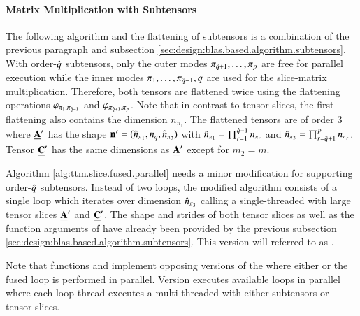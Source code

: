 \paragraph{Matrix Multiplication with Subtensors}
The following algorithm and the flattening of subtensors is a combination of the previous paragraph and subsection \ref{sec:design:blas.based.algorithm.subtensors}.
With order-$\hat{q}$ subtensors, only the outer modes $\pi_{\hat{q}+1},\dots,\pi_{p}$ are free for parallel execution while the inner modes $\pi_{1},\dots,\pi_{\hat{q}-1},q$ are used for the slice-matrix multiplication.
Therefore, both tensors are flattened twice using the flattening operations $\varphi_{\pi_{1},\pi_{\hat{q}-1}}$ and $\varphi_{\pi_{\hat{q}+1},\pi_p}$. 
Note that in contrast to tensor slices, the first flattening also contains the dimension $n_{\pi_{1}}$.
The flattened tensors are of order $3$ where $\underline{\mathbf{A}}'$ has the shape $\mathbf{n}'=(\hat{n}_{\pi_1},n_{q},\hat{n}_{\pi_3})$ with $\hat{n}_{\pi_1} = \prod_{r=1}^{\hat{q}-1} n_{\pi_r}$ and $\hat{n}_{\pi_3} = \prod_{r=\hat{q}+1}^{p} n_{\pi_r}$.
Tensor $\underline{\mathbf{C}}'$ has the same dimensions as $\underline{\mathbf{A}}'$ except for $m_2=m$.

Algorithm \ref{alg:ttm.slice.fused.parallel} needs a minor modification  for supporting order-$\hat{q}$ subtensors.
Instead of two loops, the modified algorithm consists of a single loop which iterates over dimension $\hat{n}_{\pi_3}$ calling a single-threaded  with large tensor slices $\underline{\mathbf{A}}'$ and $\underline{\mathbf{C}}'$.
The shape and strides of both tensor slices as well as the function arguments of  have already been provided by the previous subsection \ref{sec:design:blas.based.algorithm.subtensors}.
This  version will referred to as \allowbreak{}.

Note that functions  and  implement opposing versions of the  where either  or the fused loop is performed in parallel.
Version  executes available loops in parallel where each loop thread executes a multi-threaded  with either subtensors or tensor slices.


